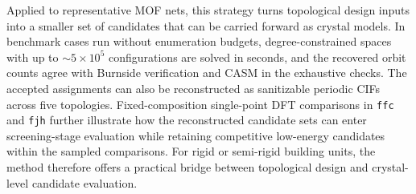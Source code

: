 \documentclass[pdflatex,sn-mathphys-num]{sn-jnl}
\theoremstyle{thmstyleone}%
\begin{document}
{Applied to representative MOF nets, this strategy turns topological design inputs into a smaller set of candidates that can be carried forward as crystal models. In benchmark cases run without enumeration budgets, degree-constrained spaces with up to $\sim\!5\times10^{5}$ configurations are solved in seconds, and the recovered orbit counts agree with Burnside verification and CASM in the exhaustive checks. The accepted assignments can also be reconstructed as sanitizable periodic CIFs across five topologies. Fixed-composition single-point DFT comparisons in \texttt{ffc} and \texttt{fjh} further illustrate how the reconstructed candidate sets can enter screening-stage evaluation while retaining competitive low-energy candidates within the sampled comparisons. For rigid or semi-rigid building units, the method therefore offers a practical bridge between topological design and crystal-level candidate evaluation.
}



\maketitle
\end{document}
